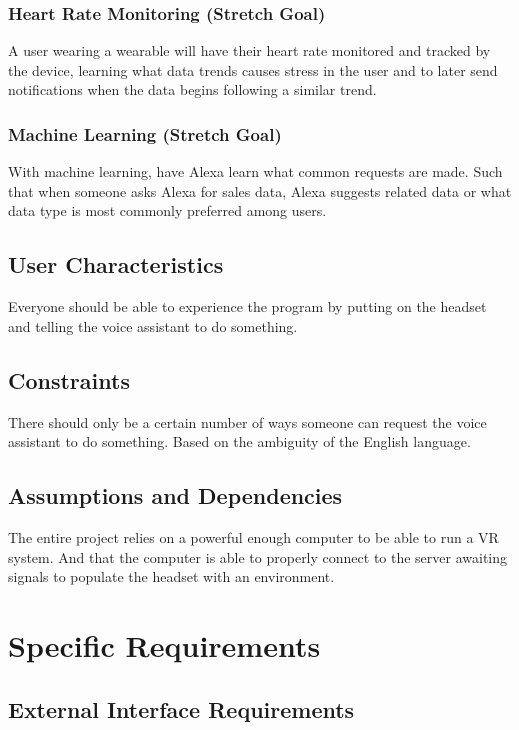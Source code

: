 \documentclass[onecolumn, draftclsnofoot,10pt, compsoc]{IEEEtran}
\begin{document}
        \subsubsection{Heart Rate Monitoring (Stretch Goal)}
            A user wearing a wearable will have their heart rate monitored and tracked by the device, learning what data trends causes stress in the user and to later send notifications when the data begins following a similar trend.

        \subsubsection{Machine Learning (Stretch Goal)}
            With machine learning, have Alexa learn what common requests are made. Such that when someone asks Alexa for sales data, Alexa suggests related data or what data type is most commonly preferred among users.

    \subsection{User Characteristics}
        Everyone should be able to experience the program by putting on the headset and telling the voice assistant to do something.

    \subsection{Constraints}
        There should only be a certain number of ways someone can request the voice assistant to do something. Based on the ambiguity of the English language.

    \subsection{Assumptions and Dependencies}
        The entire project relies on a powerful enough computer to be able to run a VR system. And that the computer is able to properly connect to the server awaiting signals to populate the headset with an environment.

\section{Specific Requirements}
    \subsection{External Interface Requirements}
\end{document}
